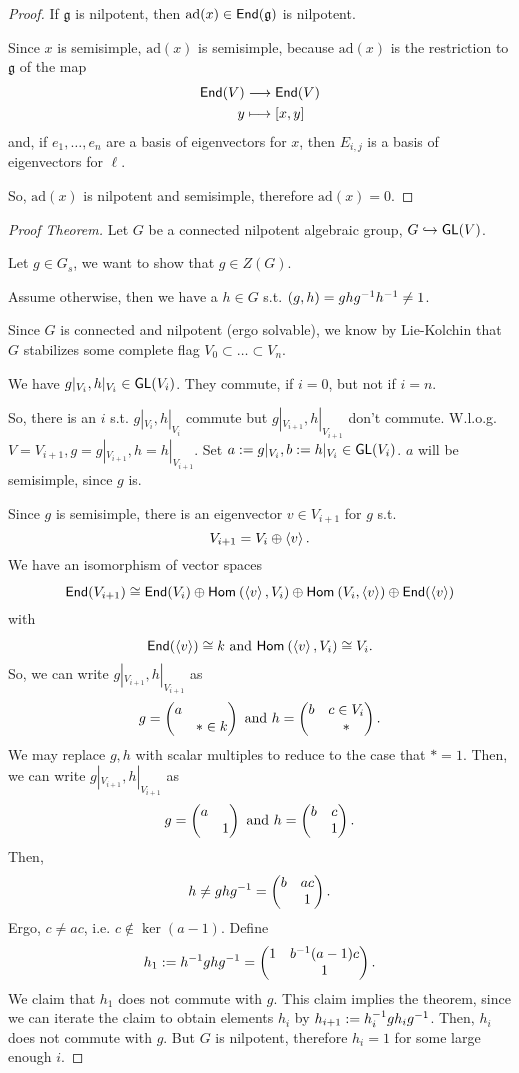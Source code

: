 \begin{proof}
If $\mathfrak{g}$ is nilpotent, then $\mathrm{ad}(x) \in \textsf{End}(\mathfrak{g})$ is nilpotent.

Since $x$ is semisimple, $\mathrm{ad}(x)$ is semisimple, because $\mathrm{ad}(x)$ is the restriction to $\mathfrak{g}$ of the map
\begin{align*}
\textsf{End}(V) & \overset{}{\longrightarrow} \textsf{End}(V)\\
y & \longmapsto [x,y]
\end{align*}
and, if $e_1, \ldots, e_n$ are a basis of eigenvectors for $x$, then $E_{i,j}$ is a basis of eigenvectors for $\ell$.

So, $\mathrm{ad}(x)$ is nilpotent and semisimple, therefore $\mathrm{ad}(x) = 0$.
\end{proof}

\begin{proof}[Proof Theorem]
	Let $G$ be a connected nilpotent algebraic group, $G \overset{}{\hookrightarrow} \textsf{GL}(V)$.
	
	Let $g \in G_s$, we want to show that $g \in Z(G)$.
	
	Assume otherwise, then we have a $h \in G$ s.t. $(g,h) = ghg^{-1} h^{-1} \neq 1$.
	
	Since $G$ is connected and nilpotent (ergo solvable), we know by Lie-Kolchin that $G$ stabilizes some complete flag $V_0 \subset \ldots \subset V_n$.
	
	We have $g|_{V_i}, h|_{V_i} \in \textsf{GL}(V_i)$. They commute, if $i = 0$, but not if $i = n$.
	
	So, there is an $i$ s.t. $g|_{V_i}, h|_{V_i}$ commute but  $g|_{V_{i+1}}, h|_{V_{i+1}}$ don't commute. W.l.o.g. $V =V_{i+1}, g = g|_{V_{i+1}}, h = h|_{V_{i+1}}$.
	Set $a:= g|_{V_i}, b:=  h|_{V_i} \in \textsf{GL}(V_i)$. $a$ will be semisimple, since $g$ is.
	
	Since $g$ is semisimple, there is an eigenvector $v \in V_{i+1}$ for $g$ s.t.
	\[ V_{i+1} = V_i \oplus \left<v\right>. \]
	We have an isomorphism of vector spaces
	\[ \textsf{End}(V_{i+1}) \overset{}{\cong} \textsf{End}(V_i) \oplus \textsf{Hom}_{}\left(\left<v\right>, V_i\right) \oplus \textsf{Hom}_{}\left(V_i, \left<v\right>\right) \oplus \textsf{End}(\left<v\right>) \]
	with
	\[ \textsf{End}(\left<v\right>) \overset{}{\cong} k \text{  and  } \textsf{Hom}_{}\left(\left<v\right>, V_i\right) \overset{}{\cong} V_i. \]
	So, we can write $ g|_{V_{i+1}},   h|_{V_{i+1}}$ as
	\[
	g = \left(\begin{matrix} a \\ & * \in k \end{matrix}\right) \text{  and  } 	h = \left(\begin{matrix} b & c \in V_i \\ & *  \end{matrix}\right).
	\]
	We may replace $g,h$ with scalar multiples to reduce to the case that $* = 1$. Then,
 we can write $ g|_{V_{i+1}},   h|_{V_{i+1}}$  as
	\[
	g = \left(\begin{matrix} a \\ & 1 \end{matrix}\right) \text{  and  } 	h = \left(\begin{matrix} b & c  \\ & 1  \end{matrix}\right).
	\]
	Then,
	\[ h\neq ghg^{-1} = \left(\begin{matrix} b & ac \\ & 1 \end{matrix}\right). \]
	Ergo, $c \neq ac$, i.e. $c \notin \ker(a -1)$. Define
	\[ h_1:= h^{-1} gh g^{-1} = \left(\begin{matrix} 
	1 & b^{-1}(a-1)c\\ & 1 \end{matrix}\right). \]
We claim that $h_1$ does not commute with $g$. This claim implies the theorem, since we can iterate the claim to obtain elements $h_i$ by $h_{i+1} := h_i^{-1} g h_i g^{-1}$. Then, $h_i$ does not commute with $g$. But $G$ is nilpotent, therefore $h_i = 1$ for some large enough $i$.


\end{proof}
